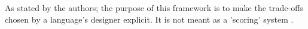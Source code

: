 As stated by the authors; the purpose of this framework is to make the trade-offs chosen by a language's designer explicit. It is not meant as a 'scoring' system \citep{green_usability_1996}.


















